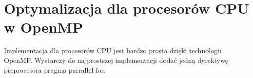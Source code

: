 
\section { Optymalizacja dla procesorów CPU w OpenMP }

Implementacja dla procesorów CPU jest bardzo prosta dzięki technologii OpenMP. Wystarczy do najprostszej implementacji dodać jedną dyrektywę preprocesora pragma parrallel for. \linebreak


